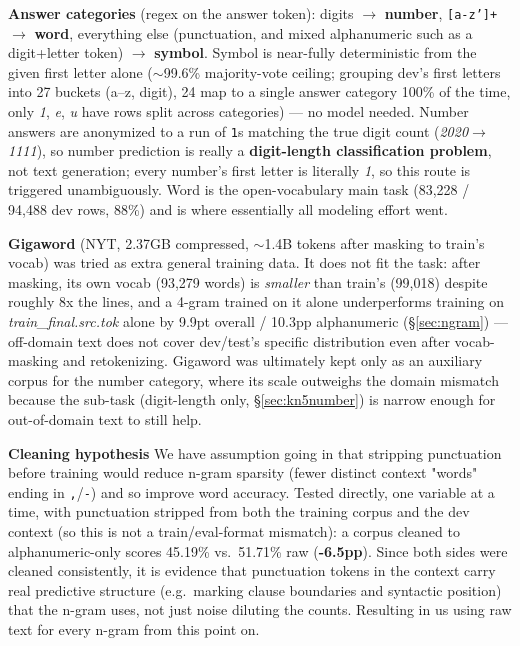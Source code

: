\documentclass[11pt,conference]{IEEEtran}
\newcommand{\code}[1]{\textit{#1}}
\begin{document}
\textbf{Answer categories} (regex on the answer token): digits $\rightarrow$
\textbf{number}, \texttt{[a-z']+} $\rightarrow$ \textbf{word}, everything else
(punctuation, and mixed alphanumeric such as a digit+letter token) $\rightarrow$
\textbf{symbol}. Symbol is near-fully deterministic from the given first
letter alone ($\sim$99.6\% majority-vote ceiling; grouping dev's first
letters into 27 buckets (a--z, digit), 24 map to a single answer category
100\% of the time, only \code{1}, \code{e}, \code{u} have rows split across
categories) --- no model needed. Number answers are anonymized to a run of \texttt{1}s
matching the true digit count (\code{2020}$\to$\code{1111}), so number
prediction is really a \textbf{digit-length classification problem}, not text
generation; every number's first letter is literally \code{1}, so this route
is triggered unambiguously. Word is the open-vocabulary main task (83,228 /
94,488 dev rows, 88\%) and is where essentially all modeling effort went.

\textbf{Gigaword} (NYT, 2.37GB compressed,
$\sim$1.4B tokens after masking to train's vocab) was tried as extra general
training data. It does not fit the task: after masking, its own vocab
(93,279 words) is \emph{smaller} than train's (99,018) despite roughly 8x the
lines, and a 4-gram trained on it alone underperforms training on
\code{train\_final.src.tok} alone by 9.9pt overall / 10.3pp alphanumeric
(\S\ref{sec:ngram}) --- off-domain text does not cover dev/test's specific
distribution even after vocab-masking and retokenizing. Gigaword was
ultimately kept only as an auxiliary corpus for the number category, where
its scale outweighs the domain mismatch because the sub-task (digit-length
only, \S\ref{sec:kn5number}) is narrow enough for out-of-domain text to still
help.

\textbf{Cleaning hypothesis} We have assumption going in that stripping
punctuation before training would reduce n-gram sparsity (fewer distinct
context "words" ending in \texttt{,}/\texttt{-}) and so improve word accuracy.
Tested directly, one variable at a time, with punctuation stripped from both
the training corpus and the dev context (so this is not a
train/eval-format mismatch): a corpus cleaned to alphanumeric-only scores 45.19\%
vs.\ 51.71\% raw (\textbf{-6.5pp}). Since both sides were cleaned
consistently, 
it is evidence that punctuation tokens in the context carry real predictive
structure (e.g.\ marking clause boundaries and syntactic position) that the
n-gram uses, not just noise diluting the counts. Resulting in us using raw text for every
n-gram from this point on.
\end{document}

